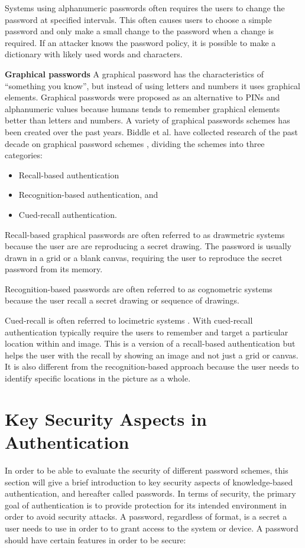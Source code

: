     Systems using alphanumeric passwords often requires the users to change the password at specified intervals. This often causes users to choose a simple password and only make a small change to the password when a change is required. If an attacker knows the password policy, it is possible to make a dictionary with likely used words and characters.

    {\bf Graphical passwords}
    A graphical password has the characteristics of ``something you know'', but instead of using letters and numbers it uses graphical elements. Graphical passwords were proposed as an alternative to PINs and alphanumeric values because humans tends to remember graphical elements better than letters and numbers. A variety of graphical passwords schemes has been created over the past years. Biddle et al. have collected research of the past decade on graphical password schemes \cite{Biddle}, dividing the schemes into three categories:

      \begin{itemize}
        \item Recall-based authentication
        \item Recognition-based authentication, and 
        \item Cued-recall authentication.
      \end{itemize}
      
    Recall-based graphical passwords are often referred to as drawmetric systems \cite{DeAngeli} because the user are are reproducing a secret drawing. The password is usually drawn in a grid or a blank canvas, requiring the user to reproduce the secret password from its memory.

    Recognition-based passwords are often referred to as cognometric systems \cite{DeAngeli} because the user recall a secret drawing or sequence of drawings.

    Cued-recall is often referred to locimetric systems \cite{DeAngeli}. With cued-recall authentication typically require the users to remember and target a particular location within and image. This is a version of a recall-based authentication but helps the user with the recall by showing an image and not just a grid or canvas. It is also different from the recognition-based approach because the user needs to identify specific locations in the picture as a whole. 
    
  \section{Key Security Aspects in Authentication} \label{sec:entropy}
  In order to be able to evaluate the security of different password schemes, this section will give a brief introduction to key security aspects of knowledge-based authentication, and hereafter called passwords. In terms of security, the primary goal of authentication is to provide protection for its intended environment in order to avoid security attacks. A password, regardless of format, is a secret a user needs to use in order to to grant access to the system or device. A password should have certain features in order to be secure:


